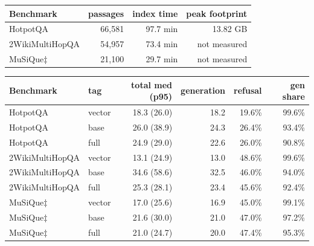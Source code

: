 \begin{tabular}{lrrr}
\toprule
Benchmark & passages & index time & peak footprint \\
\midrule
HotpotQA & 66,581 & 97.7 min & 13.82 GB \\
2WikiMultiHopQA & 54,957 & 73.4 min & not measured \\
MuSiQue$\ddagger$ & 21,100 & 29.7 min & not measured \\
\bottomrule
\end{tabular}


\begin{tabular}{llrrrr}
\toprule
Benchmark & tag & total med (p95) & generation & refusal & gen share \\
\midrule
HotpotQA & vector & 18.3 (26.0) & 18.2 & 19.6\% & 99.6\% \\
HotpotQA & base & 26.0 (38.9) & 24.3 & 26.4\% & 93.4\% \\
HotpotQA & full & 24.9 (29.0) & 22.6 & 26.0\% & 90.8\% \\
2WikiMultiHopQA & vector & 13.1 (24.9) & 13.0 & 48.6\% & 99.6\% \\
2WikiMultiHopQA & base & 34.6 (58.6) & 32.5 & 46.0\% & 94.0\% \\
2WikiMultiHopQA & full & 25.3 (28.1) & 23.4 & 45.6\% & 92.4\% \\
MuSiQue$\ddagger$ & vector & 17.0 (25.6) & 16.9 & 45.0\% & 99.1\% \\
MuSiQue$\ddagger$ & base & 21.6 (30.0) & 21.0 & 47.0\% & 97.2\% \\
MuSiQue$\ddagger$ & full & 21.0 (24.7) & 20.0 & 47.4\% & 95.3\% \\
\bottomrule
\end{tabular}